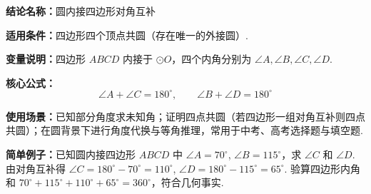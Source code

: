 \textbf{结论名称：}圆内接四边形对角互补

\textbf{适用条件：}四边形四个顶点共圆（存在唯一的外接圆）.

\textbf{变量说明：}四边形 \(ABCD\) 内接于 \(\odot O\)，四个内角分别为 \(\angle A,\angle B,\angle C,\angle D\).

\textbf{核心公式：}\[
\boxed{\angle A + \angle C = 180^\circ,\qquad \angle B + \angle D = 180^\circ}
\]

\textbf{使用场景：}已知部分角度求未知角；证明四点共圆（若四边形一组对角互补则四点共圆）；在圆背景下进行角度代换与等角推理，常用于中考、高考选择题与填空题.

\textbf{简单例子：}已知圆内接四边形 \(ABCD\) 中 \(\angle A = 70^\circ\), \(\angle B = 115^\circ\)，求 \(\angle C\) 和 \(\angle D\).
由对角互补得 \(\angle C = 180^\circ - 70^\circ = 110^\circ\), \(\angle D = 180^\circ - 115^\circ = 65^\circ\). 验算四边形内角和 \(70^\circ+115^\circ+110^\circ+65^\circ=360^\circ\)，符合几何事实.